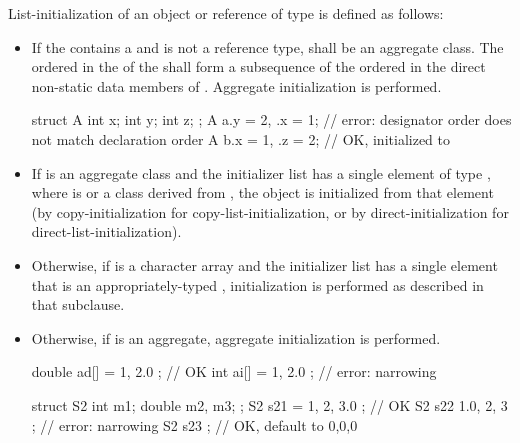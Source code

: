 \pnum
List-initialization of an object or reference of type   is defined as follows:
\begin{itemize}
\item
If the 
contains a  and
 is not a reference type,
 shall be an aggregate class.
The ordered 
in the 
of the 
shall form a subsequence
of the ordered 
in the direct non-static data members of .
Aggregate initialization is performed.
\begin{example}
\begin{codeblock}
struct A { int x; int y; int z; };
A a{.y = 2, .x = 1};                // error: designator order does not match declaration order
A b{.x = 1, .z = 2};                // OK,  initialized to 
\end{codeblock}
\end{example}

\item If  is an aggregate class and the initializer list has a single element
of type  ,
where  is  or a class derived from ,
the object is initialized from that element (by copy-initialization for
copy-list-initialization, or by direct-initialization for
direct-list-initialization).

\item Otherwise, if  is a character array and the initializer list has a
single element that is an appropriately-typed ,
initialization is performed as described in that subclause.

\item Otherwise, if  is an aggregate, aggregate initialization is
performed.

\begin{example}
\begin{codeblock}
double ad[] = { 1, 2.0 };           // OK
int ai[] = { 1, 2.0 };              // error: narrowing

struct S2 {
  int m1;
  double m2, m3;
};
S2 s21 = { 1, 2, 3.0 };             // OK
S2 s22 { 1.0, 2, 3 };               // error: narrowing
S2 s23 { };                         // OK, default to 0,0,0
\end{codeblock}
\end{example}


\end{itemize}
